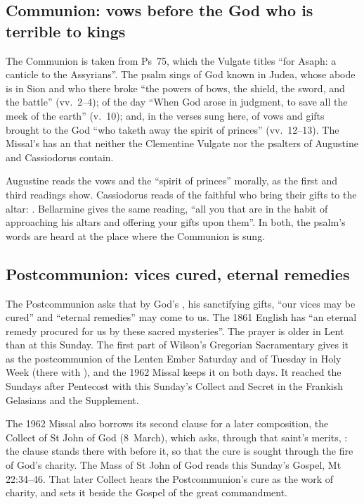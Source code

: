 \subsection{Communion: vows before the God who is terrible to kings}

The Communion is taken from Ps~75, which the Vulgate titles ``for Asaph: a
canticle to the Assyrians''. The psalm sings of God known in Judea, whose
abode is in Sion and who there broke ``the powers of bows, the shield, the
sword, and the battle'' (vv.~2--4); of the day ``When God arose in judgment,
to save all the meek of the earth'' (v.~10); and, in the verses sung here, of
vows and gifts brought to the God ``who taketh away the spirit of princes''
(vv.~12--13). The Missal's  has an 
that neither the Clementine Vulgate nor the psalters of Augustine and
Cassiodorus contain.

Augustine reads the vows and the ``spirit of princes'' morally, as the first
and third readings show. Cassiodorus reads  of the
faithful who bring their gifts to the altar: . Bellarmine
gives the same reading, ``all you that are in the habit of approaching his
altars and offering your gifts upon them''. In both, the psalm's words are
heard at the place where the Communion is sung.

\subsection{Postcommunion: vices cured, eternal remedies}

The Postcommunion asks that by God's , his sanctifying
gifts, ``our vices may be cured'' and ``eternal remedies'' may come to us. The
1861 English has ``an eternal remedy procured for us by these sacred
mysteries''. The prayer is older in Lent than at this Sunday. The first part of
Wilson's Gregorian Sacramentary gives it as the postcommunion of the Lenten
Ember Saturday and of Tuesday in Holy Week (there with ), and
the 1962 Missal keeps it on both days. It reached the Sundays after Pentecost
with this Sunday's Collect and Secret in the Frankish Gelasians and the
Supplement.

The 1962 Missal also borrows its second clause for a later composition, the
Collect of St John of God (8~March), which asks, through that saint's merits,
: the clause stands there with  before it,
so that the cure is sought through the fire of God's charity. The Mass of St
John of God reads this Sunday's Gospel, Mt 22:34--46. That later Collect hears
the Postcommunion's cure as the work of charity, and sets it beside the Gospel
of the great commandment.

